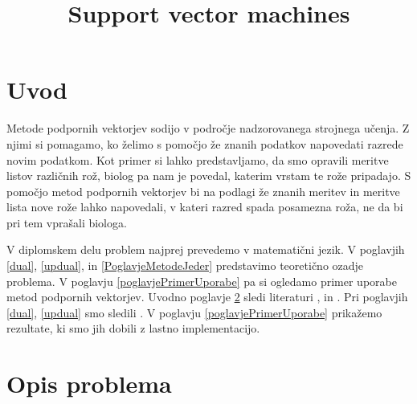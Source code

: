 \documentclass[mat1]{fmfdelo}
\title{Support vector machines}
\begin{document}
\section{Uvod}

Metode podpornih vektorjev sodijo v področje nadzorovanega strojnega učenja. Z njimi si pomagamo, ko želimo s pomočjo že znanih podatkov napovedati razrede novim podatkom.  Kot primer si lahko predstavljamo, da smo opravili meritve listov različnih rož, biolog pa nam je povedal, katerim vrstam te rože pripadajo. S pomočjo metod podpornih vektorjev bi na podlagi že znanih meritev in meritve lista nove rože lahko napovedali, v kateri razred spada posamezna roža, ne da bi pri tem vprašali biologa.

V diplomskem delu problem najprej prevedemo v matematični jezik. V poglavjih \ref{dual}, \ref{updual}, in \ref{PoglavjeMetodeJeder} predstavimo teoretično ozadje problema. V poglavju \ref{poglavjePrimerUporabe} pa si ogledamo primer uporabe metod podpornih vektorjev. Uvodno poglavje \ref{poglavjeOpisProblema} sledi literaturi \cite[str. 337--356]{DM}, \cite[str. 417--426]{ESL} in \cite[str. 214--235]{AITSL}. Pri poglavjih \ref{dual}, \ref{updual} smo sledili \cite{ITNO}. V poglavju \ref{poglavjePrimerUporabe} prikažemo rezultate, ki smo jih dobili z lastno implementacijo. 


\section{Opis problema}
\label{poglavjeOpisProblema}
\end{document}
